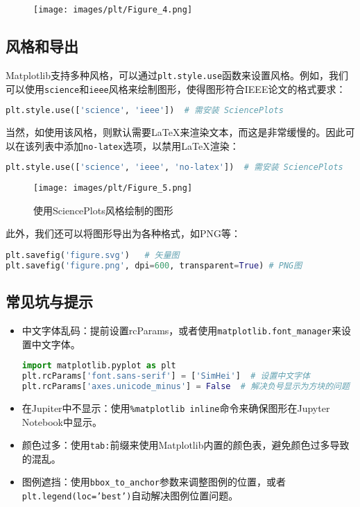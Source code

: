\documentclass[../main.tex]{subfiles}
\begin{document}
\begin{figure}[ht]
  \centering
  \texttt{[image: images/plt/Figure\_4.png]}
\end{figure}

\subsection{风格和导出}

Matplotlib支持多种风格，可以通过\texttt{plt.style.use}函数来设置风格。例如，我们可以使用\texttt{science}和\texttt{ieee}风格来绘制图形，使得图形符合IEEE论文的格式要求：
\begin{lstlisting}[language=python]
plt.style.use(['science', 'ieee'])  # 需安装 SciencePlots
\end{lstlisting}
当然，如使用该风格，则默认需要LaTeX来渲染文本，而这是非常缓慢的。因此可以在该列表中添加\texttt{no-latex}选项，以禁用LaTeX渲染：
\begin{lstlisting}[language=python]
plt.style.use(['science', 'ieee', 'no-latex'])  # 需安装 SciencePlots
\end{lstlisting}

\begin{figure}[ht]
  \centering
  \texttt{[image: images/plt/Figure\_5.png]}
  \caption{使用SciencePlots风格绘制的图形}
\end{figure}

此外，我们还可以将图形导出为各种格式，如PNG等：
\begin{lstlisting}[language=python]
plt.savefig('figure.svg')   # 矢量图
plt.savefig('figure.png', dpi=600, transparent=True) # PNG图
\end{lstlisting}

\subsection{常见坑与提示}

\begin{itemize}
  \item 中文字体乱码：提前设置rcParams，或者使用\texttt{matplotlib.font\_manager}来设置中文字体。
    \begin{lstlisting}[language=python]
import matplotlib.pyplot as plt
plt.rcParams['font.sans-serif'] = ['SimHei']  # 设置中文字体
plt.rcParams['axes.unicode_minus'] = False  # 解决负号显示为方块的问题
    \end{lstlisting}
  \item 在Jupiter中不显示：使用\texttt{\%matplotlib inline}命令来确保图形在Jupyter Notebook中显示。
  \item 颜色过多：使用\texttt{tab:}前缀来使用Matplotlib内置的颜色表，避免颜色过多导致的混乱。
  \item 图例遮挡：使用\texttt{bbox\_to\_anchor}参数来调整图例的位置，或者\texttt{plt.legend(loc='best')}自动解决图例位置问题。
\end{itemize}
\end{document}

